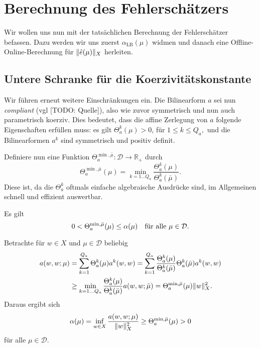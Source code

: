 
\section{Berechnung des Fehlerschätzers} %
\label{sec:berechnung_des_fehlersch_tzers}

Wir wollen uns nun mit der tatsächlichen Berechnung der Fehlerschätzer befassen.
Dazu werden wir uns zuerst $\alpha_\text{LB}(\mu)$ widmen und danach eine Offline-Online-Berechnung für $\norm{\hat e(\mu)}_X$ herleiten.

\subsection{Untere Schranke für die Koerzivitätskonstante} %
\label{sub:untere_schranke_f_r_die_koerzivit_tskonstante}
Wir führen erneut weitere Einschränkungen ein. Die Bilinearform $a$ sei nun \emph{compliant} (vgl [TODO: Quelle]), also wie zuvor symmetrisch und nun auch parametrisch koerziv. Dies bedeutet, dass die affine Zerlegung von $a$ folgende Eigenschaften erfüllen muss: es gilt $\Theta_a^k(\mu) > 0$, für $1 \leq k \leq Q_a,$ und die Bilinearformen $a^k$ sind symmetrisch und positiv definit.

Definiere nun eine Funktion $\Theta_a^{\min,\bar \mu} \colon \mathcal D \to \mathbb{R}_+$ durch
\begin{equation}
    \Theta_a^{\min, \bar \mu}(\mu) = \min_{k = 1 \ldots Q_a} \frac{\Theta_a^k(\mu)}{\Theta_a^k(\bar \mu)}.
\end{equation}
Diese ist, da die $\Theta_a^k$ oftmals einfache algebraische Ausdrücke sind, im Allgemeinen schnell und effizient auswertbar.

\begin{Satz}
    Es gilt
    \begin{equation}
        0 < \Theta_a^{\min, \bar \mu}(\mu) \leq \alpha(\mu) \quad \fa \mu \in \mathcal D.
    \end{equation}

    \begin{Beweis}
        Betrachte für $w \in X$ und $\mu \in \mathcal D$  beliebig
        \begin{align}
            a(w, w; \mu)
            &= \sum_{k=1}^{Q_a} \Theta_a^k(\mu) a^k(w, w)
            = \sum_{k=1}^{Q_a} \frac{\Theta_a^k(\mu)}{\Theta_a^k(\bar \mu)} \Theta_a^k(\bar \mu) a^k(w, w)
            \\
            &\geq \min_{k = 1 \ldots Q_a} \frac{\Theta_a^k(\mu)}{\Theta_a^k(\bar \mu)} a(w, w; \bar \mu)
            = \Theta_a^{\min, \bar \mu}(\mu) \norm{w}_X^2.
        \end{align}
        Daraus ergibt sich
        \begin{equation}
            \alpha(\mu) = \inf_{w \in X} \frac{a(w, w; \mu)}{\norm{w}^2_X} \geq \Theta_a^{\min, \bar \mu}(\mu) > 0
        \end{equation}
        für alle $\mu \in \mathcal D$.
    \end{Beweis}
\end{Satz}

